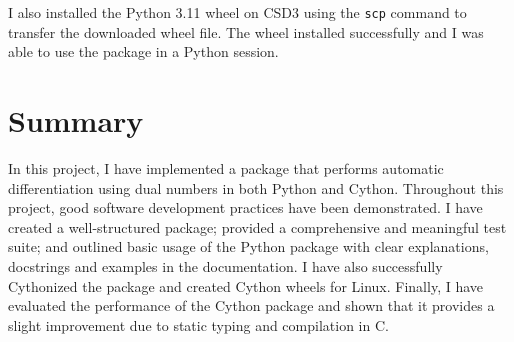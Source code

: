 \documentclass{article}
\begin{document}
I also installed the Python 3.11 wheel on CSD3 using the \texttt{scp} command to transfer the downloaded wheel file. The wheel installed successfully and I was able to use the package in a Python session. 

\section*{Summary}

In this project, I have implemented a package that performs automatic differentiation using dual numbers in both Python and Cython. Throughout this project, good software development practices have been demonstrated. I have created a well-structured package; provided a comprehensive and meaningful test suite; and outlined basic usage of the Python package with clear explanations, docstrings and examples in the documentation. I have also successfully Cythonized the package and created Cython wheels for Linux. Finally, I have evaluated the performance of the Cython package and shown that it provides a slight improvement due to static typing and compilation in C. 
\end{document}

